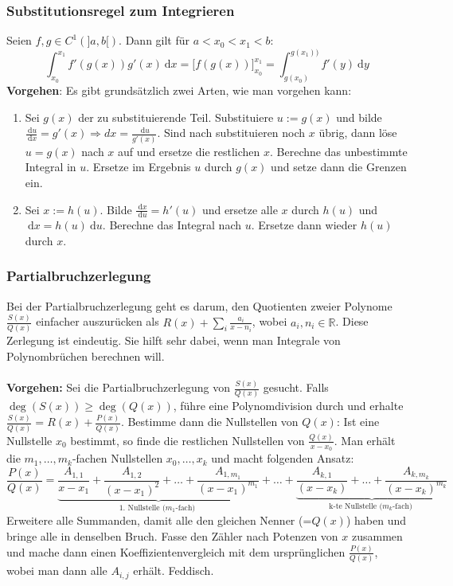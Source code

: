 \documentclass[a4paper,10pt]{scrartcl}
\newcommand{\diff}{\ \mathrm{d}}
\begin{document}
\subsubsection{Substitutionsregel zum Integrieren}
Seien $f,g \in C^1(]a,b[)$. Dann gilt für $a<x_0<x_1<b$: 
\begin{equation}
	\int_{x_0}^{x_1} f'(g(x))g'(x) \diff x = \Big[ f(g(x))\Big]_{x_0}^{x_1} = \int_{g(x_0)}^{g(x_1))} f'(y)\diff y
\end{equation}
\textbf{Vorgehen}: Es gibt grundsätzlich zwei Arten, wie man vorgehen kann: 
\begin{enumerate}
	\item Sei $g(x)$ der zu substituierende Teil. Substituiere $u:=g(x)$ und bilde $\frac{\diff u }{\diff x}= g'(x) \Longrightarrow dx = \frac{\diff u}{g'(x)}$. Sind nach substituieren noch $x$ übrig, dann löse $u=g(x)$ nach $x$ auf und ersetze die restlichen $x$.  Berechne das unbestimmte Integral in $u$. Ersetze im Ergebnis $u$ durch $g(x)$ und setze dann die Grenzen ein.
	\item Sei $x:=h(u)$. Bilde $\frac{\diff x}{\diff u} = h'(u)$ und ersetze alle $x$ durch $h(u)$ und $\diff x = h(u)\diff u$. Berechne das Integral nach $u$. Ersetze dann wieder $h(u)$ durch $x$. 
\end{enumerate}
\subsubsection{Partialbruchzerlegung}
Bei der Partialbruchzerlegung geht es darum, den Quotienten zweier Polynome $\frac{S(x)}{Q(x)}$ einfacher auszurücken als $R(x)+\sum_{i}\frac{a_i}{x-n_i}$, wobei $a_i, n_i\in\mathbb{R}$. Diese Zerlegung ist eindeutig. Sie hilft sehr dabei, wenn man Integrale von Polynombrüchen berechnen will.\\\\
\textbf{Vorgehen:} Sei die Partialbruchzerlegung von $\frac{S(x)}{Q(x)}$ gesucht. Falls $\deg(S(x))\geq \deg(Q(x))$, führe eine Polynomdivision durch und erhalte $\frac{S(x)}{Q(x)} = R(x) + \frac{P(x)}{Q(x)}$. Bestimme dann die Nullstellen von $Q(x)$: Ist eine Nullstelle $x_0$ bestimmt, so finde die restlichen Nullstellen von $\frac{Q(x)}{x-x_0}$. Man erhält die $m_1,\dots,m_k$-fachen Nullstellen $x_0,\dots,x_k$ und macht folgenden Ansatz: 
\begin{equation}
	\frac{P(x)}{Q(x)} = \underbrace{\frac{A_{1,1}}{x-x_1} + 
	\frac{A_{1,2}}{(x-x_1)^2} + \dots + \frac{A_{1,m_1}}{(x-x_1)^{m_1}}}_{\text{1. Nullstelle (} m_1\text{-fach) }} + \dots +
	\underbrace{\frac{A_{k,1}}{(x-x_k)}+ \dots + \frac{A_{k,m_k}}{(x-x_k)^{m_k}}}_{\text{k-te Nullstelle (} m_k\text{-fach) }}
\end{equation}
Erweitere alle Summanden, damit alle den gleichen Nenner (=$Q(x)$) haben und bringe alle in denselben Bruch. Fasse den Zähler nach Potenzen von $x$ zusammen und mache dann einen Koeffizientenvergleich mit dem ursprünglichen $\frac{P(x)}{Q(x)}$, wobei man dann alle $A_{i,j}$ erhält. Feddisch. 
\end{document}
